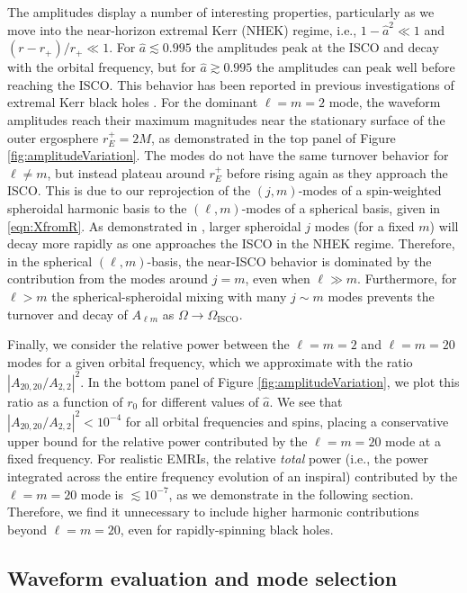 \documentclass[%
 reprint,
 nofootinbib,
 amsmath,amssymb,
 aps,
 prd,
]{revtex4-2}
\begin{document}
The amplitudes display a number of interesting properties, particularly as we move into the near-horizon extremal Kerr (NHEK) regime, i.e., $1-\hat{a}^2 \ll 1$ and $(r-r_+)/r_+ \ll 1$. For $\hat{a} \lesssim 0.995$ the amplitudes peak at the ISCO and decay with the orbital frequency, but for $\hat{a} \gtrsim 0.995$ the amplitudes can peak well before reaching the ISCO. This behavior has been reported in previous investigations of extremal Kerr black holes \cite{GralPorfWarb15, GralHughWarb16}. For the dominant $\ell = m = 2$ mode, the waveform amplitudes reach their maximum magnitudes near the stationary surface of the outer ergosphere $r_E^+ = 2M$, as demonstrated in the top panel of Figure \ref{fig:amplitudeVariation}. The modes do not have the same turnover behavior for $\ell \neq m$, but instead plateau around $r_E^+$ before rising again as they approach the ISCO. This is due to our reprojection of the $(j, m)$-modes of a spin-weighted spheroidal harmonic basis to the $(\ell, m)$-modes of a spherical basis, given in \eqref{eqn:XfromR}. As demonstrated in \cite{GralPorfWarb15}, larger spheroidal $j$ modes (for a fixed $m$) will decay more rapidly as one approaches the ISCO in the NHEK regime. Therefore, in the spherical $(\ell, m)$-basis, the near-ISCO behavior is dominated by the contribution from the modes around $j=m$, even when $\ell \gg m$. Furthermore, for $\ell > m$ the spherical-spheroidal mixing with many $j\sim m$ modes prevents the turnover and decay of $A_{\ell m}$ as $\Omega \rightarrow \Omega_\mathrm{ISCO}$.

Finally, we consider the relative power between the $\ell = m = 2$ and $\ell = m = 20$ modes for a given orbital frequency, which we approximate with the ratio $|A_{20,20}/A_{2,2}|^2$. In the bottom panel of Figure \ref{fig:amplitudeVariation}, we plot this ratio as a function of $r_0$ for different values of $\hat{a}$. We see that  $|A_{20,20}/A_{2,2}|^2 < 10^{-4}$ for all orbital frequencies and spins, placing a conservative upper bound for the relative power contributed by the $\ell = m = 20$ mode at a fixed frequency. For realistic EMRIs, the relative \emph{total} power (i.e., the power integrated across the entire frequency evolution of an inspiral) contributed by the $\ell = m = 20$ mode is $\lesssim 10^{-7}$, as we demonstrate in the following section. Therefore, we find it unnecessary to include higher harmonic contributions beyond $\ell = m = 20$, even for rapidly-spinning black holes.

\subsection{Waveform evaluation and mode selection}
\label{sec:wave}
\end{document}
